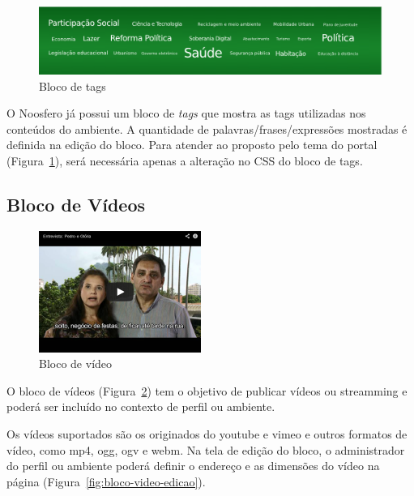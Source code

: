 \documentclass[[a4paper,11pt]{article}
\begin{document}
\begin{figure}[h]
\center
\includegraphics[scale=0.4]{bloco-tags.png}
\caption{Bloco de tags}
\label{fig:bloco-tags}
\end{figure}

O Noosfero já possui um bloco de {\it tags} que mostra as tags
utilizadas nos conteúdos do ambiente. A quantidade de
palavras/frases/expressões mostradas é definida na edição do bloco. Para atender ao
proposto pelo tema do portal (Figura~\ref{fig:bloco-tags}), será
necessária apenas a alteração no CSS do bloco de tags.

\subsection{Bloco de Vídeos}

\begin{figure}[h]
\center
\includegraphics[scale=0.4]{bloco-video.png}
\caption{Bloco de vídeo}
\label{fig:bloco-video}
\end{figure}

O bloco de vídeos (Figura~\ref{fig:bloco-video}) tem o objetivo de
publicar vídeos ou streamming e poderá ser incluído no contexto de
perfil ou ambiente. 

Os vídeos suportados são os originados do youtube e vimeo e outros
formatos de vídeo, como mp4, ogg, ogv e webm.
Na tela de edição do bloco, o administrador do perfil ou ambiente poderá
definir o endereço e as dimensões do vídeo na página 
(Figura~\ref{fig:bloco-video-edicao}).
\end{document}
